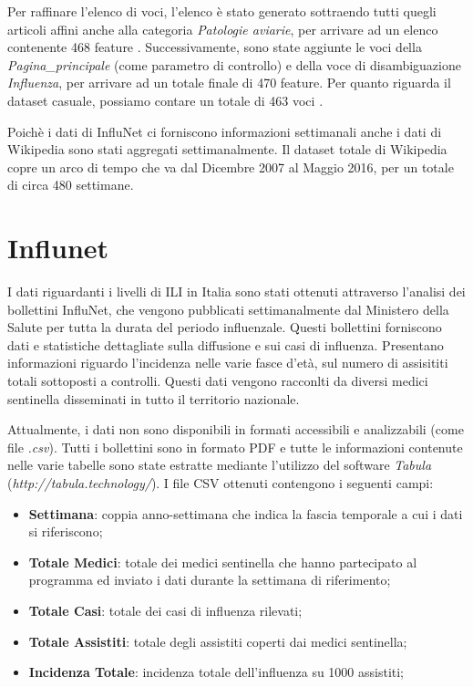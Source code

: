 Per raffinare l'elenco di voci, l'elenco è stato generato sottraendo tutti quegli articoli affini anche alla categoria 
\textit{Patologie aviarie}, per arrivare ad un elenco contenente 468 feature \cite{PetScanQuery}. Successivamente, sono state 
aggiunte le voci della \textit{Pagina_principale} (come parametro di controllo) e della voce di disambiguazione 
\textit{Influenza}, per arrivare ad un totale finale di 470 feature. Per quanto riguarda il dataset casuale, possiamo contare 
un totale di 463 voci \cite{PetScanRandom}.
\bigskip

Poichè i dati di InfluNet ci forniscono informazioni settimanali anche i dati di Wikipedia sono stati aggregati 
settimanalmente. Il dataset totale di Wikipedia copre un arco di tempo che va dal Dicembre 2007 al Maggio 2016, per un totale 
di circa 480 settimane.

\section{Influnet}
\bigskip 

I dati riguardanti i livelli di ILI in Italia sono stati ottenuti attraverso l'analisi dei bollettini InfluNet,
che vengono pubblicati settimanalmente dal Ministero della Salute per tutta la durata del periodo influenzale.
Questi bollettini forniscono dati e statistiche dettagliate sulla diffusione e sui casi di influenza. Presentano informazioni
riguardo l'incidenza nelle varie fasce d'età, sul numero di assisititi totali sottoposti a controlli. 
Questi dati vengono racconlti da diversi medici sentinella disseminati in tutto il territorio nazionale.
\bigskip

Attualmente, i dati non sono disponibili in formati accessibili e analizzabili (come file \textit{.csv}). Tutti i bollettini
sono in formato PDF e tutte le informazioni contenute nelle varie tabelle sono state estratte mediante l'utilizzo del software \textit{Tabula} (\textit{http://tabula.technology/}). I file CSV ottenuti contengono i seguenti campi:
\begin{itemize}[noitemsep]
\item \textbf{Settimana}: coppia anno-settimana che indica la fascia temporale a cui i dati si riferiscono;
\item \textbf{Totale Medici}: totale dei medici sentinella che hanno partecipato al programma ed inviato i dati durante la settimana di riferimento; 
\item \textbf{Totale Casi}: totale dei casi di influenza rilevati;
\item \textbf{Totale Assistiti}: totale degli assistiti coperti dai medici sentinella;
\item \textbf{Incidenza Totale}: incidenza totale dell'influenza su 1000 assistiti;
\end{itemize}
\bigskip

